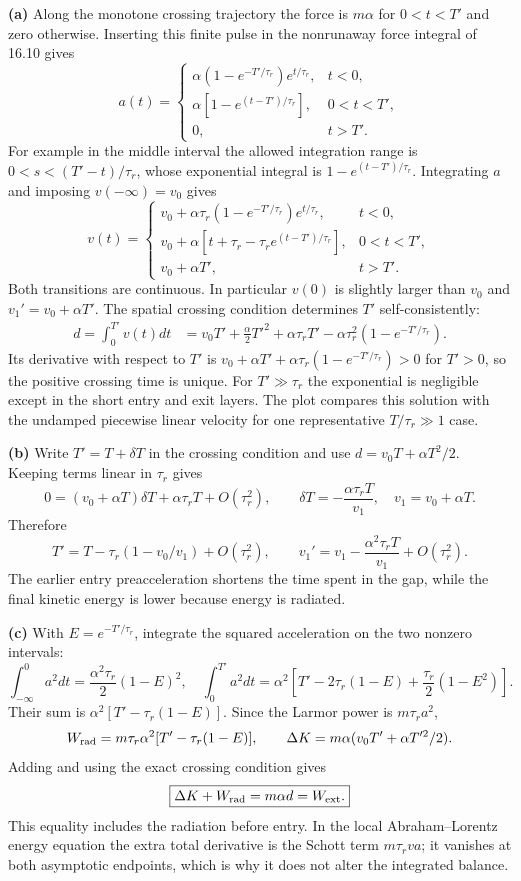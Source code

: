 \textbf{(a)} Along the monotone crossing trajectory the force is
$m\alpha$ for $0<t<T'$ and zero otherwise. Inserting this finite pulse
in the nonrunaway force integral of 16.10 gives
\[
a(t)=\begin{cases}
\alpha(1-e^{-T'/\tau_r})e^{t/\tau_r},&t<0,\\
\alpha[1-e^{(t-T')/\tau_r}],&0<t<T',\\
0,&t>T'.
\end{cases}
\]
For example in the middle interval the allowed integration range is
$0<s<(T'-t)/\tau_r$, whose exponential integral is
$1-e^{(t-T')/\tau_r}$.
Integrating $a$ and imposing $v(-\infty)=v_0$ gives
\[
\boxed{v(t)=\begin{cases}
v_0+\alpha\tau_r(1-e^{-T'/\tau_r})e^{t/\tau_r},&t<0,\\
v_0+\alpha[t+\tau_r-\tau_r e^{(t-T')/\tau_r}],&0<t<T',\\
v_0+\alpha T',&t>T'.
\end{cases}}
\]
Both transitions are continuous. In particular $v(0)$ is slightly
larger than $v_0$ and $v_1'=v_0+\alpha T'$.
The spatial crossing condition determines $T'$ self-consistently:
\begin{align*}
d=\int_0^{T'}v(t)dt
&=v_0T'+\frac\alpha2T'^2+\alpha\tau_rT'
-\alpha\tau_r^2(1-e^{-T'/\tau_r}).
\end{align*}
Its derivative with respect to $T'$ is
$v_0+\alpha T'+\alpha\tau_r(1-e^{-T'/\tau_r})>0$ for $T'>0$,
so the positive crossing time is unique. For $T'\gg\tau_r$ the
exponential is negligible except in the short entry and exit layers.
The plot compares this solution with the undamped piecewise linear
velocity for one representative $T/\tau_r\gg1$ case.
\begin{center}\end{center}

\textbf{(b)} Write $T'=T+\delta T$ in the crossing condition and use
$d=v_0T+\alpha T^2/2$. Keeping terms linear in $\tau_r$ gives
\[
0=(v_0+\alpha T)\delta T+\alpha\tau_rT+O(\tau_r^2),\qquad
\delta T=-\frac{\alpha\tau_rT}{v_1},\quad v_1=v_0+\alpha T.
\]
Therefore
\[
\boxed{T'=T-\tau_r(1-v_0/v_1)+O(\tau_r^2),\qquad
v_1'=v_1-\frac{\alpha^2\tau_rT}{v_1}+O(\tau_r^2).}
\]
The earlier entry preacceleration shortens the time spent in the gap,
while the final kinetic energy is lower because energy is radiated.

\textbf{(c)} With $E=e^{-T'/\tau_r}$, integrate the squared acceleration
on the two nonzero intervals:
\[
\int_{-\infty}^0a^2dt=\frac{\alpha^2\tau_r}{2}(1-E)^2,
\quad
\int_0^{T'}a^2dt=\alpha^2
\left[T'-2\tau_r(1-E)+\frac{\tau_r}{2}(1-E^2)\right].
\]
Their sum is $\alpha^2[T'-\tau_r(1-E)]$.
Since the Larmor power is $m\tau_ra^2$,
\[
W_{\rm rad}=m\tau_r\alpha^2[T'-\tau_r(1-E)],\qquad
\Delta K=m\alpha(v_0T'+\alpha T'^2/2).
\]
Adding and using the exact crossing condition gives
\[
\boxed{\Delta K+W_{\rm rad}=m\alpha d=W_{\rm ext}.}
\]
This equality includes the radiation before entry. In the local
Abraham--Lorentz energy equation the extra total derivative is the
Schott term $m\tau_rva$; it vanishes at both asymptotic endpoints,
which is why it does not alter the integrated balance.

